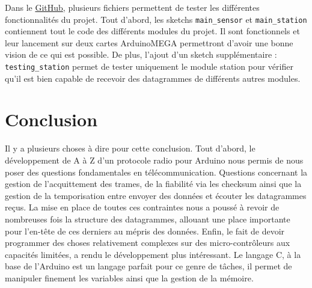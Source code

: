 \documentclass[a4paper]{article}
\begin{document}
Dans le \href{https://github.com/winston2968/ArdyWeather.git}{GitHub}, plusieurs fichiers permettent de tester 
les différentes fonctionnalités du projet. 
Tout d'abord, les sketchs \texttt{main\_sensor} et \texttt{main\_station} contiennent tout le code des différents 
modules du projet. Il sont fonctionnels et leur lancement sur deux cartes ArduinoMEGA permettront d'avoir une bonne 
vision de ce qui est possible. 
De plus, l'ajout d'un sketch supplémentaire : \texttt{testing\_station} permet de tester uniquement le module station pour vérifier qu'il est 
bien capable de recevoir des datagrammes de différents autres modules. 




\section{Conclusion}

Il y a plusieurs choses à dire pour cette conclusion. 
Tout d'abord, le développement de A à Z d'un protocole radio pour Arduino nous permis de nous poser des questions 
fondamentales en télécommunication. Questions concernant la gestion de l'acquittement des trames, de 
la fiabilité via les checksum ainsi que la gestion de la temporisation entre envoyer des données et écouter les 
datagrammes reçus. 
La mise en place de toutes ces contraintes nous a poussé à revoir de nombreuses fois la structure des datagrammes, 
allouant une place importante pour l'en-tête de ces derniers au mépris des données. 
Enfin, le fait de devoir programmer des choses relativement complexes sur des micro-contrôleurs aux capacités 
limitées, a rendu le développement plus intéressant. 
Le langage C, à la base de l'Arduino est un langage parfait pour ce genre de tâches, il permet de manipuler 
finement les variables ainsi que la gestion de la mémoire. 
\end{document}
